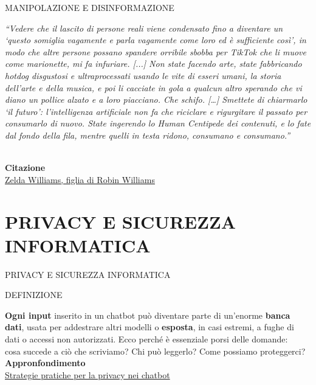 \documentclass[aspectratio=1610]{beamer}
\begin{document}
\begin{frame}{MANIPOLAZIONE E DISINFORMAZIONE}
    \begin{minipage}{0.98\linewidth}
        \centering
        \textit{``Vedere che il lascito di persone reali viene condensato fino a diventare un 
        ‘questo somiglia vagamente e parla vagamente come loro ed è sufficiente così’, in modo che 
        altre persone possano spandere orribile sbobba per TikTok che li muove come marionette, mi 
        fa infuriare. [...] Non state facendo arte, state fabbricando hotdog disgustosi e 
        ultraprocessati usando le vite di esseri umani, la storia dell’arte e della musica, 
        e poi li cacciate in gola a qualcun altro sperando che vi diano un pollice alzato e a 
        loro piacciano. Che schifo. […] Smettete di chiarmarlo ‘il futuro’: l’intelligenza artificiale non 
        fa che riciclare e rigurgitare il passato per consumarlo di nuovo. State ingerendo lo 
        Human Centipede dei contenuti, e lo fate dal fondo della fila, mentre quelli in testa 
        ridono, consumano e consumano.''}\\
    \end{minipage}\\
    \bigskip
    \tiny{\textbf{Citazione}}\\
    \tiny{\href{https://attivissimo.me/2025/10/21/podcast-rsi-sora-il-caos-continua-dopo-il-copyright-calpesta-i-morti/}{Zelda Williams, figlia di Robin Williams}}
\end{frame}


\section{PRIVACY E SICUREZZA INFORMATICA}

\begin{frame}{PRIVACY E SICUREZZA INFORMATICA}
    \begin{alertblock}{DEFINIZIONE}
        \begin{minipage}{0.96\linewidth}
            \justifying
            \textbf{Ogni input} inserito in un chatbot può diventare parte di un’enorme \textbf{banca dati}, 
            usata per addestrare altri modelli o \textbf{esposta}, in casi estremi, a fughe di dati o 
            accessi non autorizzati. Ecco perché è essenziale porsi delle domande: \\
            cosa succede a ciò che scriviamo? Chi può leggerlo? Come possiamo proteggerci?\\
            \bigskip
            \tiny{\textbf{Appronfondimento}}\\
            \tiny{\href{https://www.agendadigitale.eu/sicurezza/privacy/i-chatbot-e-lillusione-della-privacy-9-modi-per-difendere-i-nostri-dati/}{Strategie pratiche per la privacy nei chatbot}}
        \end{minipage}
    \end{alertblock}
\end{frame}
\end{document}
